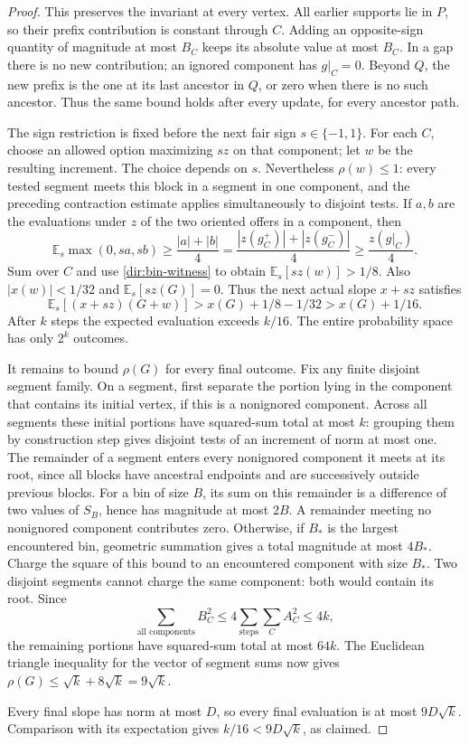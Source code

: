 \begin{proof}
This preserves the invariant at every vertex. All earlier supports lie
in $P$, so their prefix contribution is constant through $C$. Adding
an opposite-sign quantity of magnitude at most $B_C$ keeps its absolute
value at most $B_C$. In a gap there is no new contribution; an ignored
component has $g|_C=0$. Beyond $Q$, the new prefix is the one at its last
ancestor in $Q$, or zero when there is no such ancestor. Thus the same
bound holds after every update, for every ancestor path.

The sign restriction is fixed before the next fair sign $s\in\{-1,1\}$.
For each $C$, choose an allowed option maximizing $s z$ on that
component; let $w$ be the resulting increment.  The choice depends on
$s$.  Nevertheless $\rho(w)\le1$: every tested segment meets this block
in a segment in one component, and the preceding contraction estimate
applies simultaneously to disjoint tests.  If $a,b$ are the evaluations
under $z$ of the two oriented offers in a component, then
\[
 \mathbb E_s\max(0,sa,sb)
 \ge\frac{|a|+|b|}{4}
 =\frac{|z(g_C^+)|+|z(g_C^-)|}{4}
 \ge\frac{z(g|_C)}4.
\]
Sum over $C$ and use \eqref{dir:bin-witness} to obtain
$\mathbb E_s[s z(w)]>1/8$.  Also $|x(w)|<1/32$ and
$\mathbb E_s[s z(G)]=0$.  Thus the next actual slope $x+sz$ satisfies
\[
 \mathbb E_s[(x+sz)(G+w)]>x(G)+1/8-1/32>x(G)+1/16.
\]
After $k$ steps the expected evaluation exceeds $k/16$.  The entire
probability space has only $2^k$ outcomes.

It remains to bound $\rho(G)$ for every final outcome.  Fix any finite
disjoint segment family.  On a segment, first separate the portion
lying in the component that contains its initial vertex, if this is
a nonignored component.  Across all segments these initial portions
have squared-sum total at most $k$: grouping them by construction step
gives disjoint tests of an increment of norm at most one.
The remainder of a segment enters every nonignored component it meets
at its root, since all blocks have ancestral endpoints and are
successively outside previous blocks.  For a bin of size $B$, its sum
on this remainder is a difference of two values of $S_B$, hence
has magnitude at most $2B$. A remainder meeting no nonignored component
contributes zero. Otherwise, if $B_*$ is the largest encountered bin,
geometric summation gives a total magnitude at most $4B_*$.  Charge the
square of this bound to an encountered component with size $B_*$.
Two disjoint segments cannot charge the same component: both would
contain its root.  Since
\[
 \sum_{\text{all components}}B_C^2
 \le4\sum_{\text{steps}}\sum_CA_C^2\le4k,
\]
the remaining portions have squared-sum total at most $64k$.
The Euclidean triangle inequality for the vector of segment sums now
gives $\rho(G)\le\sqrt{k}+8\sqrt{k}=9\sqrt{k}$.

Every final slope has norm at most $D$, so every final evaluation is at
most $9D\sqrt{k}$.  Comparison with its expectation gives
$k/16<9D\sqrt{k}$, as claimed.
\end{proof}


